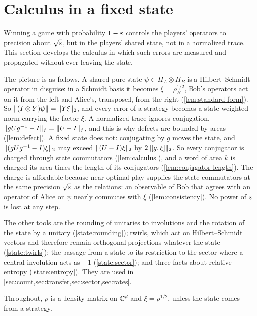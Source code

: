 \section{Calculus in a fixed state}\label{sec:state}

Winning a game with probability $1-\varepsilon$ controls the players' operators to precision about $\sqrt{\varepsilon}$, but in the players' shared state,
not in a normalized trace. This section develops the calculus in which such errors are measured and propagated without ever leaving the
state.

The picture is as follows. A shared pure state $\psi\in H_A\otimes H_B$ is a Hilbert--Schmidt operator in disguise: in a Schmidt basis it
becomes $\xi=\rho_B^{1/2}$, Bob's operators act on it from the left and Alice's, transposed, from the right (\cref{lem:standard-form}). So
$\lVert (I\otimes Y)\psi\rVert=\lVert Y\xi\rVert_2$, and every error of a strategy becomes a state-weighted norm carrying the factor $\xi$. A normalized
trace ignores conjugation, $\lVert gUg^{-1}-I\rVert_f=\lVert U-I\rVert_f$, and this is why defects are bounded by areas (\cref{lem:defect}). A fixed state
does not: conjugating by $g$ moves the state, and $\lVert (gUg^{-1}-I)\xi\rVert_2$ may exceed $\lVert (U-I)\xi\rVert_2$ by $2\lVert [g,\xi]\rVert_2$. So every
conjugator is charged through state commutators (\cref{lem:calculus}), and a word of area $k$ is charged its area times the length of
its conjugators (\cref{lem:conjugator-length}). The charge is affordable because near-optimal play supplies the state commutators at the
same precision $\sqrt{\varepsilon}$ as the relations: an observable of Bob that agrees with an operator of Alice on $\psi$ nearly commutes with
$\xi$ (\cref{lem:consistency}). No power of $\varepsilon$ is lost at any step.

The other tools are the rounding of unitaries to involutions and the rotation of the state by a unitary (\cref{state:rounding}); twirls,
which act on Hilbert--Schmidt vectors and therefore remain orthogonal projections whatever the state (\cref{state:twirls}); the passage
from a state to its restriction to the sector where a central involution acts as $-1$ (\cref{state:sector}); and three facts about
relative entropy (\cref{state:entropy}). They are used in \cref{sec:count,sec:transfer,sec:sector,sec:rates}.

Throughout, $\rho$ is a density matrix on $\mathbb C^d$ and $\xi=\rho^{1/2}$, unless the state comes from a strategy.

